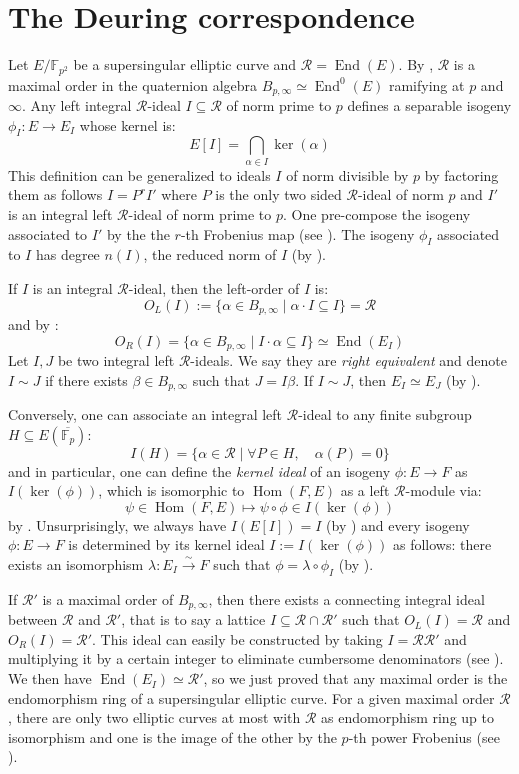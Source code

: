 \documentclass[a4paper,10pt]{report}
\theoremstyle{definition}
\theoremstyle{plain}
\theoremstyle{definition}
\newcommand{\F}{\mathbb{F}}
\newcommand{\m}[1]{\mathcal{#1}}
\renewcommand{\(}{\left(}
\renewcommand{\)}{\right)}
\DeclareMathOperator{\Hom}{Hom}
\DeclareMathOperator{\End}{End}
\begin{document}
\section{The Deuring correspondence}\label{paragraph 2}

Let $E/\F_{p^2}$ be a supersingular elliptic curve and $\m{R}=\End(E)$.  By \cite[theorem 42.1.9]{Voight}, $\m{R}$ is a maximal order in the quaternion algebra $B_{p,\infty}\simeq\End^0(E)$ ramifying at $p$ and $\infty$. Any left integral $\m{R}$-ideal $I\subseteq \m{R}$ of norm prime to $p$ defines a separable isogeny $\phi_I : E\longrightarrow E_I$ whose kernel is:
\[E[I]=\bigcap_{\alpha\in I}\ker(\alpha)\]
This definition can be generalized to ideals $I$ of norm divisible by $p$ by factoring them as follows $I=P^r I'$ where $P$ is the only two sided $\m{R}$-ideal of norm $p$ and $I'$ is an integral left $\m{R}$-ideal of norm prime to $p$.  One pre-compose the isogeny associated to $I'$ by the the $r$-th Frobenius map (see \cite[42.2.4]{Voight}).  The isogeny $\phi_I$ associated to $I$ has degree $n(I)$, the reduced norm of $I$ (by \cite[proposition 42.2.16.(a)]{Voight}).

If $I$ is an integral $\m{R}$-ideal, then the left-order of $I$ is: 
\[O_L(I):=\{\alpha\in B_{p,\infty}\mid \alpha\cdot I \subseteq I\}=\m{R}\]
and by \cite[lemma 42.2.9]{Voight}:
\[O_R(I)=\{\alpha\in B_{p,\infty}\mid I\cdot\alpha \subseteq I\}\simeq \End(E_I)\]
Let $I, J$ be two integral left $\m{R}$-ideals. We say they are \emph{right equivalent} and denote $I\sim J$ if there exists $\beta\in B_{p,\infty}$ such that $J=I\beta$. If $I\sim J$, then $E_I\simeq E_J$ (by \cite[lemma 42.2.13]{Voight}).

Conversely, one can associate an integral left $\m{R}$-ideal to any finite subgroup $H\subseteq E(\overline{\F_p})$:
\[I(H)=\{\alpha\in\m{R}\mid\forall P\in H, \quad \alpha(P)=0\}\]
and in particular, one can define the \emph{kernel ideal} of an isogeny $\phi : E\longrightarrow F$ as $I(\ker(\phi))$, which is isomorphic to $\Hom(F,E)$ as a left $\m{R}$-module via:
\[\psi\in\Hom(F,E) \longmapsto \psi\circ\phi\in I(\ker(\phi)) \]
by \cite[lemma 42.2.7]{Voight}. Unsurprisingly, we always have $I(E[I])=I$ (by \cite[proposition 42.2.16.(b)]{Voight}) and every isogeny $\phi :E\longrightarrow F$ is determined by its kernel ideal $I:=I(\ker(\phi))$ as follows: there exists an isomorphism $\lambda : E_I\overset{\sim}{\longrightarrow} F$ such that $\phi=\lambda\circ\phi_I$ (by \cite[corollary 42.2.21]{Voight}).

If $\m{R}'$ is a maximal order of $B_{p,\infty}$, then there exists a connecting integral ideal between $\m{R}$ and $\m{R}'$, that is to say a lattice $I\subseteq \m{R}\cap\m{R}'$ such that $O_L(I)=\m{R}$ and $O_R(I)=\m{R}'$. This ideal can easily be constructed by taking $I=\m{R}\m{R}'$ and multiplying it by a certain integer to eliminate cumbersome denominators (see \cite[lemma 17.4.7]{Voight}). We then have $\End(E_I)\simeq\m{R}'$, so we just proved that any maximal order is the endomorphism ring of a supersingular elliptic curve. For a given maximal order $\m{R}$, there are only two elliptic curves at most with $\m{R}$ as endomorphism ring up to isomorphism and one is the image of the other by the $p$-th power Frobenius (see \cite[lemma 42.4.1]{Voight}).   
\end{document}
